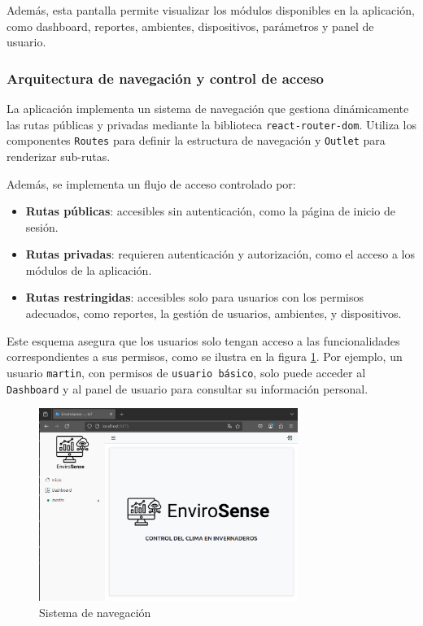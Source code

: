 Además, esta pantalla permite visualizar los módulos disponibles en la
aplicación, como dashboard, reportes, ambientes, dispositivos, parámetros y
panel de usuario.

\subsubsection{Arquitectura de navegación y control de acceso}

La aplicación implementa un sistema de navegación que gestiona dinámicamente
las rutas públicas y privadas mediante la biblioteca \texttt{react-router-dom}.
Utiliza los componentes \texttt{Routes} para definir la estructura de
navegación y \texttt{Outlet} para renderizar sub-rutas.

Además, se implementa un flujo de acceso controlado por:

\begin{itemize}
    \item \textbf{Rutas públicas}: accesibles sin autenticación, como la página de
          inicio de sesión.
    \item \textbf{Rutas privadas}: requieren autenticación y autorización, como el
          acceso a los módulos de la aplicación.
    \item \textbf{Rutas restringidas}: accesibles solo para usuarios con los permisos
          adecuados, como reportes, la gestión de usuarios, ambientes, y dispositivos.
\end{itemize}

Este esquema asegura que los usuarios solo tengan acceso a las funcionalidades
correspondientes a sus permisos, como se ilustra en la figura
\ref{fig:navegacion}. Por ejemplo, un usuario \texttt{martin}, con permisos de
\texttt{usuario básico}, solo puede acceder al \texttt{Dashboard} y al panel de
usuario para consultar su información personal.

\begin{figure}[H]
    \centering
    \includegraphics[width=0.75\textwidth]{./Images/26_navegacion.png}
    \caption{Sistema de navegación}
    \label{fig:navegacion}
\end{figure}

